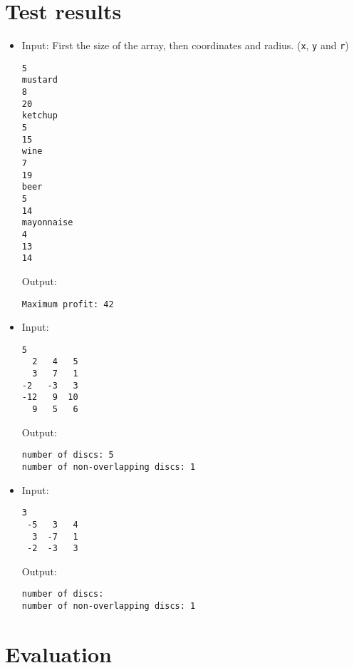 \documentclass[a4paper,10pt]{article}
\begin{document}
\section{Test results}

\begin{itemize}

\item Input: First the size of the array, then coordinates and radius. ({\tt x}, {\tt y} and {\tt r})
\begin{lstlisting}[style = stdio]
5
mustard
8
20
ketchup
5
15
wine
7
19
beer
5
14
mayonnaise
4
13
14
\end{lstlisting}

  Output:
\begin{lstlisting}[style = stdio]
Maximum profit: 42
\end{lstlisting}


\item Input:
\begin{lstlisting}[style = stdio]
5
  2   4   5
  3   7   1
-2   -3   3
-12   9  10
  9   5   6
\end{lstlisting}

  Output:
\begin{lstlisting}[style = stdio]
number of discs: 5
number of non-overlapping discs: 1
\end{lstlisting}


\item Input: 
\begin{lstlisting}[style = stdio]
3
 -5   3   4
  3  -7   1
 -2  -3   3
\end{lstlisting}

  Output:
\begin{lstlisting}[style = stdio]
number of discs: 
number of non-overlapping discs: 1
\end{lstlisting}

\end{itemize}

\section{Evaluation}
\end{document}
